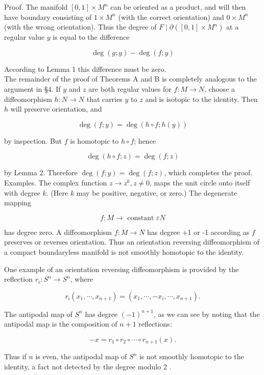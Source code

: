 \documentclass[10pt, letterpaper]{article}
\begin{document}
Proof. The manifold $[0,1] \times M^{n}$ can be oriented as a product, and will then have boundary consisting of $1 \times M^{n}$ (with the correct orientation) and $0 \times M^{n}$ (with the wrong orientation). Thus the degree of $F \mid \partial\left([0,1] \times M^{n}\right)$ at a regular value $y$ is equal to the difference

$$
\operatorname{deg}(g ; y)-\operatorname{deg}(f ; y)
$$

According to Lemma 1 this difference must be zero.\\
The remainder of the proof of Theorems A and B is completely analogous to the argument in §4. If $y$ and $z$ are both regular values for $f: M \rightarrow N$, choose a diffeomorphism $h: N \rightarrow N$ that carries $y$ to $z$ and is isotopic to the identity. Then $h$ will preserve orientation, and

$$
\operatorname{deg}(f ; y)=\operatorname{deg}(h \circ f ; h(y))
$$

by inspection. But $f$ is homotopic to $h \circ f$; hence

$$
\operatorname{deg}(h \circ f ; z)=\operatorname{deg}(f ; z)
$$

by Lemma 2. Therefore $\operatorname{deg}(f ; y)=\operatorname{deg}(f ; z)$, which completes the proof.\\
Examples. The complex function $z \rightarrow z^{k}, z \neq 0$, maps the unit circle onto itself with degree $k$. (Here $k$ may be positive, negative, or zero.) The degenerate mapping

$$
f: M \rightarrow \text { constant } \varepsilon N
$$

has degree zero. A diffeomorphism $f: M \rightarrow N$ has degree +1 or -1 according as $f$ preserves or reverses orientation. Thus an orientation reversing diffeomorphism of a compact boundaryless manifold is not smoothly homotopic to the identity.

One example of an orientation reversing diffeomorphism is provided by the reflection $r_{i}: S^{n} \rightarrow S^{n}$, where

$$
r_{\imath}\left(x_{1}, \cdots, x_{n+1}\right)=\left(x_{1}, \cdots,-x_{i}, \cdots, x_{n+1}\right) .
$$

The antipodal map of $S^{n}$ has degree $(-1)^{n+1}$, as we can see by noting that the antipodal map is the composition of $n+1$ reflections:

$$
-x=r_{1} \circ r_{2} \circ \cdots \circ r_{n+1}(x) .
$$

Thus if $n$ is even, the antipodal map of $S^{n}$ is not smoothly homotopic to the identity, a fact not detected by the degree modulo 2 .
\end{document}
